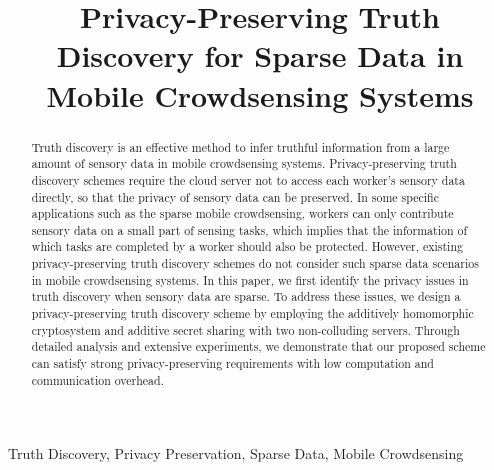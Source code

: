 \documentclass[conference]{IEEEtran}
\begin{document}
\title{Privacy-Preserving Truth Discovery for Sparse Data in Mobile Crowdsensing Systems\\
}

\author{
}
\maketitle

\begin{abstract}
Truth discovery is an effective method to infer truthful information from a large amount of sensory data in mobile crowdsensing systems.
Privacy-preserving truth discovery schemes require the cloud server not to access each worker's sensory data directly, so that the privacy of sensory data can be preserved.
In some specific applications such as the sparse mobile crowdsensing, workers can only contribute sensory data on a small part of sensing tasks, which implies that the information of which tasks are completed by a worker should also be protected.
However, existing privacy-preserving truth discovery schemes do not consider such sparse data scenarios in mobile crowdsensing systems.
In this paper, we first identify the privacy issues in truth discovery when sensory data are sparse.
To address these issues, we design a privacy-preserving truth discovery scheme by employing the additively homomorphic cryptosystem and additive secret sharing with two non-colluding servers.
Through detailed analysis and extensive experiments, we demonstrate that our proposed scheme can satisfy strong privacy-preserving requirements with low computation and communication overhead.
\end{abstract}
\begin{IEEEkeywords}
Truth Discovery, Privacy Preservation, Sparse Data, Mobile Crowdsensing
\end{IEEEkeywords}
\end{document}
